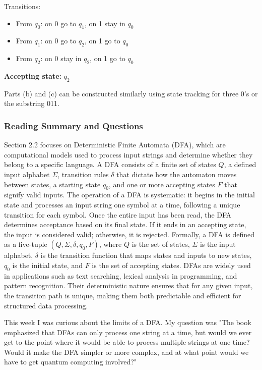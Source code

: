 \documentclass{article}
\theoremstyle{theorem}
\theoremstyle{definition}
\theoremstyle{remark}
\begin{document}
Transitions:
\begin{itemize}
    \item From $q_0$: on 0 go to $q_1$, on 1 stay in $q_0$
    \item From $q_1$: on 0 go to $q_2$, on 1 go to $q_0$
    \item From $q_2$: on 0 stay in $q_2$, on 1 go to $q_0$
\end{itemize}

\textbf{Accepting state:} $q_2$

Parts (b) and (c) can be constructed similarly using state tracking for three 0’s or the substring 011.

\subsubsection*{Reading Summary and Questions}

Section 2.2 focuses on Deterministic Finite Automata (DFA), which are computational models used to process input strings and determine whether they belong to a specific language. 
A DFA consists of a finite set of states $Q$, a defined input alphabet $\Sigma$, transition rules $\delta$ that 
dictate how the automaton moves between states, a starting state $q_0$, and one or more accepting states $F$ that signify valid inputs.
The operation of a DFA is systematic: it begins in the initial state and processes an input string one symbol at a time, following a unique transition for each symbol. 
Once the entire input has been read, the DFA determines acceptance based on its final state. If it ends in an accepting state, the input is considered valid; otherwise, it is rejected.
Formally, a DFA is defined as a five-tuple $(Q, \Sigma, \delta, q_0, F)$, where $Q$ is the set of states, $\Sigma$ is the input alphabet, $\delta$ is the transition function that maps 
states and inputs to new states, $q_0$ is the initial state, and $F$ is the set of accepting states. 
DFAs are widely used in applications such as text searching, lexical analysis in programming, and pattern recognition. Their deterministic nature ensures that for any given input, 
the transition path is unique, making them both predictable and efficient for structured data processing.

\smallskip

This week I was curious about the limits of a DFA. My question was "The book emphasized that DFAs can only process one string at a time, but would we ever get to the point where it would 
be able to process multiple strings at one time? Would it make the DFA simpler or more complex, and at what point would we have to get quantum computing involved?"
\end{document}
